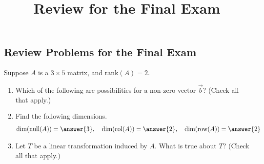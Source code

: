 \documentclass{ximera}
\title{Review for the Final Exam} \license{CC BY-NC-SA 4.0}
\begin{document}
\begin{abstract}
 \end{abstract}
\maketitle

\begin{onlineOnly}
\section*{Review Problems for the Final Exam}
\end{onlineOnly}

\begin{exercise}
    Suppose $A$ is a $3\times 5$ matrix, and $\text{rank}(A)=2$.  

    \begin{enumerate}
    \item Which of the following are possibilities for a non-zero vector $\vec{b}$? (Check all that apply.)

    \begin{selectAll}
    \end{selectAll}
\item Find the following dimensions.
$$\text{dim}(\text{null}(A))=\answer{3},\quad \text{dim}(\text{col}(A))=\answer{2},\quad \text{dim}(\text{row}(A))=\answer{2}$$

 \item Let $T$ be a linear transformation induced by $A$.  What is true about $T$? (Check all that apply.)

    \begin{selectAll}
    \end{selectAll}
    \end{enumerate}
\end{exercise}
\end{document}
